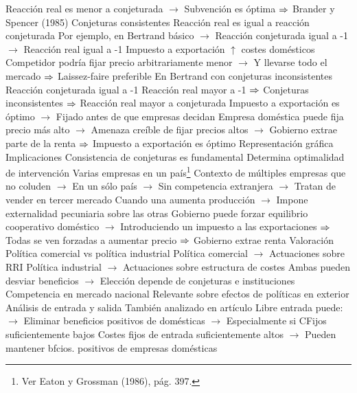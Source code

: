 \documentclass{nuevotema}
\begin{document}
\begin{esquemal}
				\4[] Reacción real es menor a conjeturada
				\4[] $\to$ Subvención es óptima
				\4[] $\Rightarrow$ Brander y Spencer (1985)
				\4 Conjeturas consistentes
				\4[] Reacción real es igual a reacción conjeturada
				\4[] Por ejemplo, en Bertrand básico
				\4[] $\to$ Reacción conjeturada igual a -1
				\4[] $\to$ Reacción real igual a -1
				\4[] Impuesto a exportación $\uparrow$ costes domésticos
				\4[] Competidor podría fijar precio arbitrariamente menor
				\4[] $\to$ Y llevarse todo el mercado
				\4[] $\Rightarrow$ Laissez-faire preferible
				\4 En Bertrand con conjeturas inconsistentes
				\4[] Reacción conjeturada igual a -1
				\4[] Reacción real mayor a -1
				\4[] $\Rightarrow$ Conjeturas inconsistentes
				\4[] $\Rightarrow$ Reacción real mayor a conjeturada
				\4[] Impuesto a exportación es óptimo
				\4[] $\to$ Fijado antes de que empresas decidan
				\4[] Empresa doméstica puede fija precio más alto
				\4[] $\to$ Amenaza creíble de fijar precios altos
				\4[] $\to$ Gobierno extrae parte de la renta
				\4[] $\Rightarrow$ Impuesto a exportación es óptimo
				\4[] Representación gráfica
				\4[] 
			\3 Implicaciones
				\4 Consistencia de conjeturas es fundamental
				\4[] Determina optimalidad de intervención
				\4 Varias empresas en un país\footnote{Ver Eaton y Grossman (1986), pág. 397.}
				\4[] Contexto de múltiples empresas que no coluden
				\4[] $\to$ En un sólo país
				\4[] $\to$ Sin competencia extranjera
				\4[] $\to$ Tratan de vender en tercer mercado
				\4[] Cuando una aumenta producción
				\4[] $\to$ Impone externalidad pecuniaria sobre las otras
				\4[] Gobierno puede forzar equilibrio cooperativo doméstico
				\4[] $\to$ Introduciendo un impuesto a las exportaciones
				\4[] $\Rightarrow$ Todas se ven forzadas a aumentar precio
				\4[] $\Rightarrow$ Gobierno extrae renta
			\3 Valoración
				\4 Política comercial vs política industrial
				\4[] Política comercial
				\4[] $\to$ Actuaciones sobre RRI
				\4[] Política industrial
				\4[] $\to$ Actuaciones sobre estructura de costes
				\4[] Ambas pueden desviar beneficios
				\4[] $\to$ Elección depende de conjeturas e instituciones
				\4 Competencia en mercado nacional
				\4[] Relevante sobre efectos de políticas en exterior
				\4 Análisis de entrada y salida
				\4[] También analizado en artículo
				\4[] Libre entrada puede:
				\4[] $\to$ Eliminar beneficios positivos de domésticas
				\4[] $\to$ Especialmente si CFijos suficientemente bajos
				\4[] Costes fijos de entrada suficientemente altos
				\4[] $\to$ Pueden mantener bfcios. positivos de empresas domésticas

\end{esquemal}
\end{document}
